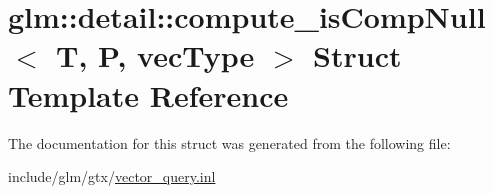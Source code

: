 \hypertarget{structglm_1_1detail_1_1compute__isCompNull}{}\section{glm\+:\+:detail\+:\+:compute\+\_\+is\+Comp\+Null$<$ T, P, vec\+Type $>$ Struct Template Reference}
\label{structglm_1_1detail_1_1compute__isCompNull}


The documentation for this struct was generated from the following file\+:\begin{DoxyCompactItemize}
\item 
include/glm/gtx/\hyperlink{vector__query_8inl}{vector\+\_\+query.\+inl}\end{DoxyCompactItemize}
